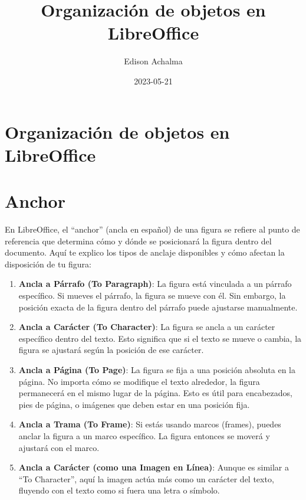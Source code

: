 \documentclass[
  jou,
  floatsintext,
  longtable,
  a4paper,
  nolmodern,
  notxfonts,
  notimes,
  12pt,
  colorlinks=true,linkcolor=blue,citecolor=blue,urlcolor=blue]{apa7}
\title{Organización de objetos en LibreOffice}
\author{Edison Achalma}
\affiliation{
{Escuela Profesional de Economía, Universidad Nacional de San Cristóbal
de Huamanga}}
\date{2023-05-21}
\begin{document}
\maketitle


\hypertarget{toc}{}
\tableofcontents
\newpage
\section[Introduction]{Organización de objetos en LibreOffice}

\setcounter{secnumdepth}{3}

\setlength\LTleft{0pt}




\section{Anchor}\label{anchor}

En LibreOffice, el ``anchor'' (ancla en español) de una figura se
refiere al punto de referencia que determina cómo y dónde se posicionará
la figura dentro del documento. Aquí te explico los tipos de anclaje
disponibles y cómo afectan la disposición de tu figura:

\begin{enumerate}
\def\labelenumi{\arabic{enumi}.}
\item
  \textbf{Ancla a Párrafo (To Paragraph)}: La figura está vinculada a un
  párrafo específico. Si mueves el párrafo, la figura se mueve con él.
  Sin embargo, la posición exacta de la figura dentro del párrafo puede
  ajustarse manualmente.
\item
  \textbf{Ancla a Carácter (To Character)}: La figura se ancla a un
  carácter específico dentro del texto. Esto significa que si el texto
  se mueve o cambia, la figura se ajustará según la posición de ese
  carácter.
\item
  \textbf{Ancla a Página (To Page)}: La figura se fija a una posición
  absoluta en la página. No importa cómo se modifique el texto
  alrededor, la figura permanecerá en el mismo lugar de la página. Esto
  es útil para encabezados, pies de página, o imágenes que deben estar
  en una posición fija.
\item
  \textbf{Ancla a Trama (To Frame)}: Si estás usando marcos (frames),
  puedes anclar la figura a un marco específico. La figura entonces se
  moverá y ajustará con el marco.
\item
  \textbf{Ancla a Carácter (como una Imagen en Línea)}: Aunque es
  similar a ``To Character'', aquí la imagen actúa más como un carácter
  del texto, fluyendo con el texto como si fuera una letra o símbolo.
\end{enumerate}
\end{document}

